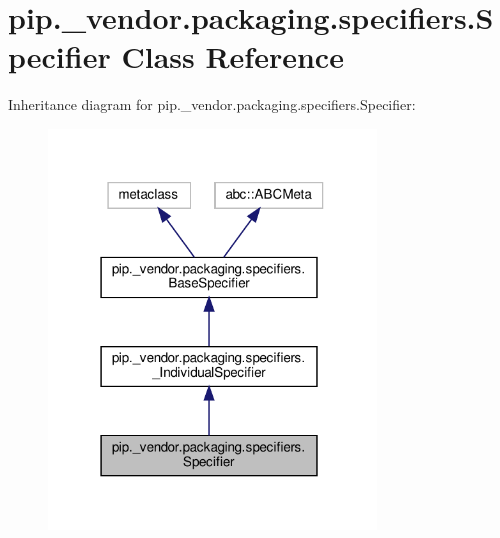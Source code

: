 \hypertarget{classpip_1_1__vendor_1_1packaging_1_1specifiers_1_1Specifier}{}\section{pip.\+\_\+vendor.\+packaging.\+specifiers.\+Specifier Class Reference}
\label{classpip_1_1__vendor_1_1packaging_1_1specifiers_1_1Specifier}


Inheritance diagram for pip.\+\_\+vendor.\+packaging.\+specifiers.\+Specifier\+:
\nopagebreak
\begin{figure}[H]
\begin{center}
\leavevmode
\includegraphics[width=247pt]{classpip_1_1__vendor_1_1packaging_1_1specifiers_1_1Specifier__inherit__graph}
\end{center}
\end{figure}


